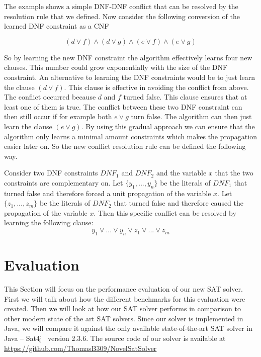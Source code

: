 \documentclass{easychair}
\begin{document}
The example shows a simple DNF-DNF conflict that can be resolved by the resolution rule that we defined. Now consider the following conversion of the learned DNF constraint as a CNF

\begin{displaymath}
(d \vee f) \wedge (d \vee g) \wedge (e \vee f) \wedge (e \vee g)
\end{displaymath}

So by learning the new DNF constraint the algorithm effectively learns four new clauses. This number could grow exponentially with the size of the DNF constraint. An alternative to learning the DNF constraints would be to just learn the clause $(d \vee f)$. This clause is effective in avoiding the conflict from above. The conflict occurred because $d$ and $f$ turned false. This clause ensures that at least one of them is true. The conflict between these two DNF constraint can then still occur if for example both $e \vee g$ turn false. The algorithm can then just learn the clause $(e \vee g)$. By using this gradual approach we can ensure that the algorithm only learns a minimal amount constraints which makes the propagation easier later on. So the new conflict resolution rule can be defined the following way.

Consider two DNF constraints $DNF_1$ and $DNF_2$ and the variable $x$ that the two constraints are complementary on. Let $\{y_1,...,y_n\}$ be the literals of $DNF_1$ that turned false and therefore forced a unit propagation of the variable $x$. Let $\{z_1,...,z_m\}$ be the literals of $DNF_2$ that turned false and therefore caused the propagation of the variable $x$. Then this specific conflict can be resolved by learning the following clause:
\begin{displaymath}
y_1 \vee ... \vee y_n \vee z_1 \vee ... \vee z_m
\end{displaymath}










\section{Evaluation}
\label{ch:Evaluation}

This Section will focus on the performance evaluation of our new SAT solver. First we will talk about how the different benchmarks for this evaluation were created. Then we will look at how our SAT solver performs in comparison to other modern state of the art SAT solvers. Since our solver is implemented in Java, we will compare it against the only available state-of-the-art SAT solver in Java -- Sat4j~\cite{le2010sat4j} version 2.3.6. The source code of our solver is available at \url{https://github.com/ThomasB309/NovelSatSolver}
\end{document}
